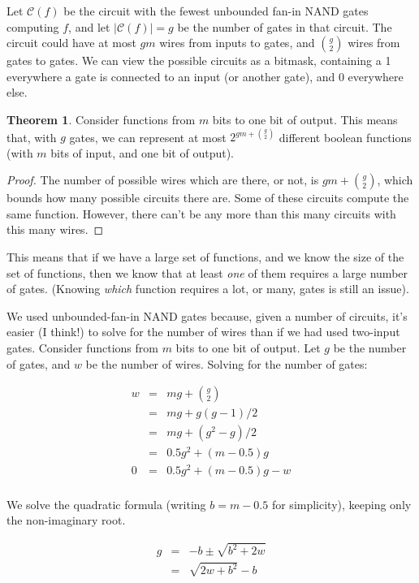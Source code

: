 \documentclass[12pt]{article}
\theoremstyle{definition}
\newtheorem{thm}{Theorem}[section]
\newcommand{\bigC}[0]{\mathcal{C}}
\begin{document}
Let $\bigC(f)$ be the circuit
with the fewest unbounded fan-in NAND
gates computing $f$, and let $|\bigC(f)| = g$ be the number of gates in
that circuit. The
circuit could have at most $gm$ wires from inputs to gates, and ${g \choose 2}$
wires from gates to gates. We can view the possible circuits as a bitmask,
containing a 1 everywhere a gate is connected to an input (or another gate),
and 0 everywhere else.

\begin{thm}
\label{boundFromCounting}
Consider functions from $m$ bits to one bit of output.
This means that, with $g$ gates, we can represent at most
$2^{gm + {g \choose 2}}$ different boolean functions (with $m$ bits of input,
and one bit of output).
\end{thm}
\begin{proof}

The number of possible wires which are there, or not, is $gm + {g \choose 2}$,
which bounds how many possible circuits there are.
Some of these circuits compute the same function.
However, there can't be any more than this many circuits with this many wires.
\end{proof}

This means that if we have a large set of functions, and we know the size of
the set of functions, then we know that at least {\em one} of them requires
a large number of gates. (Knowing {\em which} function requires a lot, or many,
gates is still an issue).

We used unbounded-fan-in NAND gates because, given a number of circuits,
it's easier (I think!) to solve for the number of wires than if we had
used two-input gates.
Consider functions from $m$ bits to one bit of output.
Let $g$ be the number of gates, and $w$ be the number of wires.
Solving for the number of gates:

\begin{eqnarray*}
w & = & mg + {g \choose 2} \\
  & = & mg + g(g-1)/2 \\
  & = & mg + (g^2 - g) / 2 \\
  & = & 0.5g^2 + (m-0.5)g \\
0 & = & 0.5g^2 + (m-0.5)g - w \\
\end{eqnarray*}

We solve the quadratic formula (writing $b = m-0.5$ for simplicity), keeping
only the non-imaginary root.

\begin{eqnarray*}
g & = & -b \pm \sqrt{ b^2 + 2w} \\
  & = & {\sqrt {2w + b^2}} - b \\
\end{eqnarray*}
\end{document}
